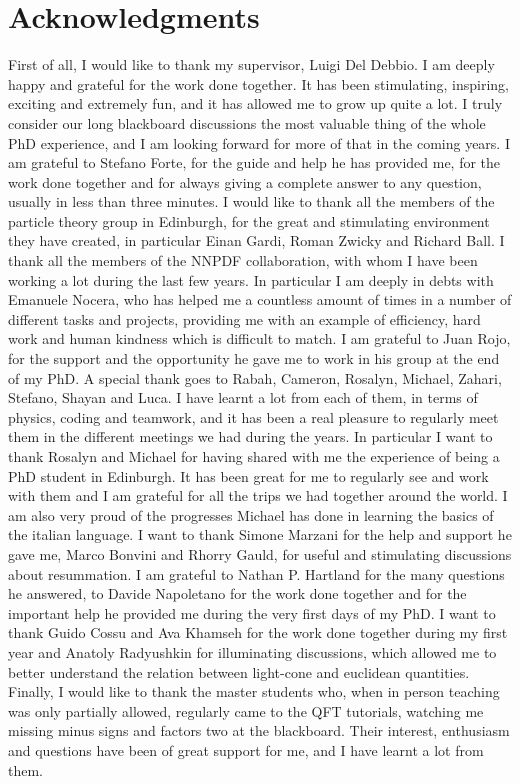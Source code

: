 \chapter*{Acknowledgments}
%
First of all, I would like to thank my supervisor, Luigi Del Debbio.
I am deeply happy and grateful for the work done together.
It has been stimulating, inspiring, exciting and extremely fun, and it has allowed me to grow up
quite a lot.
I truly consider our long blackboard discussions the most valuable thing of the whole PhD experience, and
I am looking forward for more of that in the coming years.
%
I am grateful to Stefano Forte, for the guide and help he has provided me, for the work done together 
and for always giving a complete answer to any question, usually in less than three minutes.
I would like to thank all the members of the particle theory group in Edinburgh, for the 
great and stimulating environment they have created, in particular Einan Gardi, Roman Zwicky and Richard Ball. 
%
I thank all the members of the NNPDF collaboration, with whom I have been working a lot during the last
few years. In particular I am deeply in debts with Emanuele Nocera, who has helped me a countless amount of 
times in a number of different tasks and projects, providing me with an example of efficiency, hard work and human kindness which
is difficult to match. I am grateful to Juan Rojo, for the support and the opportunity he gave me to work in his group
at the end of my PhD.
%
A special thank goes to Rabah, Cameron, Rosalyn, Michael, Zahari, Stefano, Shayan
and Luca. I have learnt a lot from each of them, in terms of physics, coding and teamwork, and it has been a real pleasure
to regularly meet them in the different meetings we had during the years.
In particular I want to thank Rosalyn and Michael for having shared with me the experience of being a PhD student in Edinburgh.
It has been great for me to regularly see and work with them and I am grateful for all the trips
we had together around the world. 
I am also very proud of the progresses Michael has done in learning the basics of the italian language.
%
I want to thank Simone Marzani for the help and support he gave me, Marco Bonvini and Rhorry Gauld, for 
useful and stimulating discussions about resummation.  
%
I am grateful to Nathan P. Hartland for the many questions he answered, to
Davide Napoletano for the work done together and for the important help he provided me during the very first days of my PhD.
I want to thank Guido Cossu and Ava Khamseh for the work done together during my first year
and Anatoly Radyushkin for illuminating discussions, which allowed me to better understand the relation 
between light-cone and euclidean quantities. Finally, I would like to thank the master students who, when 
in person teaching was only partially allowed, regularly came to the QFT tutorials, watching me missing
minus signs and factors two at the blackboard.
Their interest, enthusiasm and questions have been of great support for me, and I have learnt a lot from them. 


